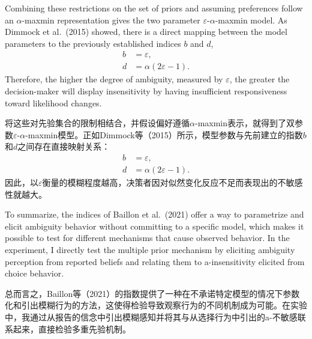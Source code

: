 \documentclass[12pt,a4paper]{article}
\newenvironment{original}
  {\par\medskip\noindent\color{black}\ignorespaces}
  {\par\medskip}
\newenvironment{translation}
  {\par\noindent\color{transblue}\ignorespaces}
  {\par\medskip\medskip}
\begin{document}
\begin{original}
Combining these restrictions on the set of priors and assuming preferences follow an $\alpha$-maxmin representation gives the two parameter $\varepsilon$-$\alpha$-maxmin model. As Dimmock et al.\ (2015) showed, there is a direct mapping between the model parameters to the previously established indices $b$ and $d$,
\begin{align}
b &= \varepsilon, \label{eq:4}\\[4pt]
d &= \alpha(2\varepsilon - 1). \label{eq:5}
\end{align}
Therefore, the higher the degree of ambiguity, measured by $\varepsilon$, the greater the decision-maker will display insensitivity by having insufficient responsiveness toward likelihood changes.
\end{original}

\begin{translation}
将这些对先验集合的限制相结合，并假设偏好遵循$\alpha$-maxmin表示，就得到了双参数$\varepsilon$-$\alpha$-maxmin模型。正如Dimmock等（2015）所示，模型参数与先前建立的指数$b$和$d$之间存在直接映射关系：
\begin{align}
b &= \varepsilon, \\[4pt]
d &= \alpha(2\varepsilon - 1).
\end{align}
因此，以$\varepsilon$衡量的模糊程度越高，决策者因对似然变化反应不足而表现出的不敏感性就越大。
\end{translation}

\begin{original}
To summarize, the indices of Baillon et al.\ (2021) offer a way to parametrize and elicit ambiguity behavior without committing to a specific model, which makes it possible to test for different mechanisms that cause observed behavior. In the experiment, I directly test the multiple prior mechanism by eliciting ambiguity perception from reported beliefs and relating them to a-insensitivity elicited from choice behavior.
\end{original}

\begin{translation}
总而言之，Baillon等（2021）的指数提供了一种在不承诺特定模型的情况下参数化和引出模糊行为的方法，这使得检验导致观察行为的不同机制成为可能。在实验中，我通过从报告的信念中引出模糊感知并将其与从选择行为中引出的a-不敏感联系起来，直接检验多重先验机制。
\end{translation}

\newpage
\end{document}
